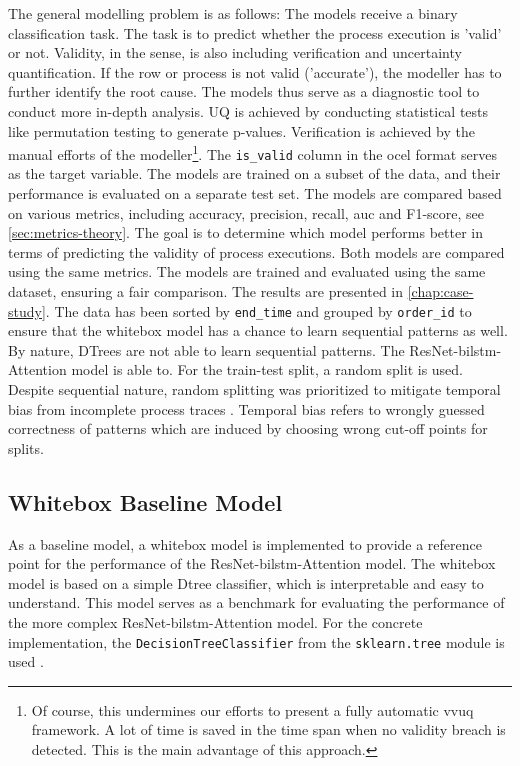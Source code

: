 The general modelling problem is as follows: The models receive a binary classification task. The task is to predict whether the process execution is 'valid' or not. Validity, in the sense, is also including verification and uncertainty quantification. If the row or process is not valid ('accurate'), the modeller has to further identify the root cause. The models thus serve as a diagnostic tool to conduct more in-depth analysis. UQ is achieved by conducting statistical tests like permutation testing to generate p-values. Verification is achieved by the manual efforts of the modeller\footnote{Of course, this undermines our efforts to present a fully automatic \gls{vvuq} framework. A lot of time is saved in the time span when no validity breach is detected. This is the main advantage of this approach.}. The \texttt{is\_valid} column in the \gls{ocel} format serves as the target variable. The models are trained on a subset of the data, and their performance is evaluated on a separate test set. The models are compared based on various metrics, including accuracy, precision, recall, \gls{auc} and F1-score, see \autoref{sec:metrics-theory}. The goal is to determine which model performs better in terms of predicting the validity of process executions. Both models are compared using the same metrics. The models are trained and evaluated using the same dataset, ensuring a fair comparison. The results are presented in \autoref{chap:case-study}. The data has been sorted by \texttt{end\_time} and grouped by \texttt{order\_id} to ensure that the whitebox model has a chance to learn sequential patterns as well. By nature, DTrees are not able to learn sequential patterns. The ResNet-\gls{bilstm}-Attention model is able to. For the train-test split, a random split is used. Despite sequential nature, random splitting was prioritized to mitigate temporal bias from incomplete process traces \autocite{morita2022investigation}. Temporal bias refers to wrongly guessed correctness of patterns which are induced by choosing wrong cut-off points for splits.


\subsection{Whitebox Baseline Model}
As a baseline model, a whitebox model is implemented to provide a reference point for the performance of the ResNet-\gls{bilstm}-Attention model. The whitebox model is based on a simple Dtree classifier, which is interpretable and easy to understand. This model serves as a benchmark for evaluating the performance of the more complex ResNet-\gls{bilstm}-Attention model. For the concrete implementation, the \texttt{DecisionTreeClassifier} from the \texttt{sklearn.tree} module is used \autocite{Scikit-Learn}.

